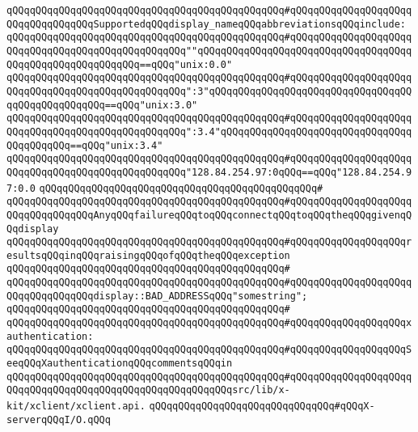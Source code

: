 \verb|qQQqqQQqqQQqqQQqqQQqqQQqqQQqqQQqqQQqqQQqqQQqqQQq#qQQqqQQqqQQqqQQqqQQqqQQqqQQqqQQqqQQqSupportedqQQqdisplay_nameqQQqabbreviationsqQQqinclude:|\newline
\verb|qQQqqQQqqQQqqQQqqQQqqQQqqQQqqQQqqQQqqQQqqQQqqQQq#qQQqqQQqqQQqqQQqqQQqqQQqqQQqqQQqqQQqqQQqqQQqqQQqqQQq""qQQqqQQqqQQqqQQqqQQqqQQqqQQqqQQqqQQqqQQqqQQqqQQqqQQqqQQqqQQq==qQQq"unix:0.0"|\newline
\verb|qQQqqQQqqQQqqQQqqQQqqQQqqQQqqQQqqQQqqQQqqQQqqQQq#qQQqqQQqqQQqqQQqqQQqqQQqqQQqqQQqqQQqqQQqqQQqqQQqqQQq":3"qQQqqQQqqQQqqQQqqQQqqQQqqQQqqQQqqQQqqQQqqQQqqQQqqQQq==qQQq"unix:3.0"|\newline
\verb|qQQqqQQqqQQqqQQqqQQqqQQqqQQqqQQqqQQqqQQqqQQqqQQq#qQQqqQQqqQQqqQQqqQQqqQQqqQQqqQQqqQQqqQQqqQQqqQQqqQQq":3.4"qQQqqQQqqQQqqQQqqQQqqQQqqQQqqQQqqQQqqQQqqQQq==qQQq"unix:3.4"|\newline
\verb|qQQqqQQqqQQqqQQqqQQqqQQqqQQqqQQqqQQqqQQqqQQqqQQq#qQQqqQQqqQQqqQQqqQQqqQQqqQQqqQQqqQQqqQQqqQQqqQQqqQQq"128.84.254.97:0qQQq==qQQq"128.84.254.97:0.0|\newline
\verb|qQQqqQQqqQQqqQQqqQQqqQQqqQQqqQQqqQQqqQQqqQQqqQQq#|\newline
\verb|qQQqqQQqqQQqqQQqqQQqqQQqqQQqqQQqqQQqqQQqqQQqqQQq#qQQqqQQqqQQqqQQqqQQqqQQqqQQqqQQqqQQqAnyqQQqfailureqQQqtoqQQqconnectqQQqtoqQQqtheqQQqgivenqQQqdisplay|\newline
\verb|qQQqqQQqqQQqqQQqqQQqqQQqqQQqqQQqqQQqqQQqqQQqqQQq#qQQqqQQqqQQqqQQqqQQqresultsqQQqinqQQqraisingqQQqofqQQqtheqQQqexception|\newline
\verb|qQQqqQQqqQQqqQQqqQQqqQQqqQQqqQQqqQQqqQQqqQQqqQQq#|\newline
\verb|qQQqqQQqqQQqqQQqqQQqqQQqqQQqqQQqqQQqqQQqqQQqqQQq#qQQqqQQqqQQqqQQqqQQqqQQqqQQqqQQqqQQqdisplay::BAD_ADDRESSqQQq"somestring";|\newline
\verb|qQQqqQQqqQQqqQQqqQQqqQQqqQQqqQQqqQQqqQQqqQQqqQQq#|\newline
\verb|qQQqqQQqqQQqqQQqqQQqqQQqqQQqqQQqqQQqqQQqqQQqqQQq#qQQqqQQqqQQqqQQqqQQqxauthentication:|\newline
\verb|qQQqqQQqqQQqqQQqqQQqqQQqqQQqqQQqqQQqqQQqqQQqqQQq#qQQqqQQqqQQqqQQqqQQqSeeqQQqXauthenticationqQQqcommentsqQQqin|\newline
\verb|qQQqqQQqqQQqqQQqqQQqqQQqqQQqqQQqqQQqqQQqqQQqqQQq#qQQqqQQqqQQqqQQqqQQqqQQqqQQqqQQqqQQqqQQqqQQqqQQqqQQqqQQqqQQqsrc/lib/x-kit/xclient/xclient.api.|\newline
\newline
\newline
\verb|qQQqqQQqqQQqqQQqqQQqqQQqqQQqqQQq#qQQqX-serverqQQqI/O.qQQq|\newline
